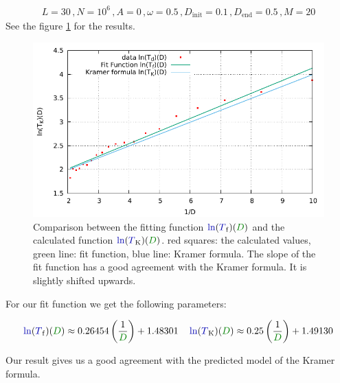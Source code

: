 \documentclass[10pt,fleqn,%
reqno,a4paper]{article}
\makeatletter
\def\mathcolor#1#{\@mathcolor{#1}}
\def\@mathcolor#1#2#3{%
        \protect\leavevmode
        \begingroup\color#1{#2}#3\endgroup
}
\newcommand{\nT}{\mathcolor{blue!70!black}{T}}
\newcommand{\nln}{\mathcolor{blue!70!black}{\ln}}
\newcommand{\nD}{\mathcolor{green!50!black}{D}}
\makeatother
\begin{document}
\begin{align*}
L = 30\,, N = 10^6\,, A = 0\,, \omega=0.5\,, D_{\mathrm{init}} = 0.1\,,  D_{\mathrm{end}} = 0.5\,, M = 20
\end{align*}
See the figure \ref{pic:T_K} for the results.
\begin{figure}[htp!]
	\begin{center}
		\includegraphics[width=\linewidth]{../sourcecode_output_Data/plotting-T_K-docu-2.pdf}%
		\caption{Comparison between the fitting function $ \nln(\nT_{\mathrm{f}})(\nD) $ and the calculated function $ \nln(\nT_{\mathrm{K}})(\nD) $. red squares: the calculated values, green line: fit function, blue line: Kramer formula. The slope of the fit function has a good agreement with the Kramer formula. It is slightly shifted upwards.}
		\label{pic:T_K}
	\end{center}
\end{figure}

For our fit function we get the following parameters:

\begin{align*}
\nln(\nT_{\mathrm{f}})(\nD) \approx 0.26454\left( \frac{1}{\nD}\right) + 1.48301 \quad \nln (\nT_{\mathrm{K}})(\nD) \approx 0.25\left( \frac{1}{\nD} \right) + 1.49130
\end{align*}

 Our result gives us a good agreement with the predicted model of the Kramer formula. 
\newpage
\end{document}
